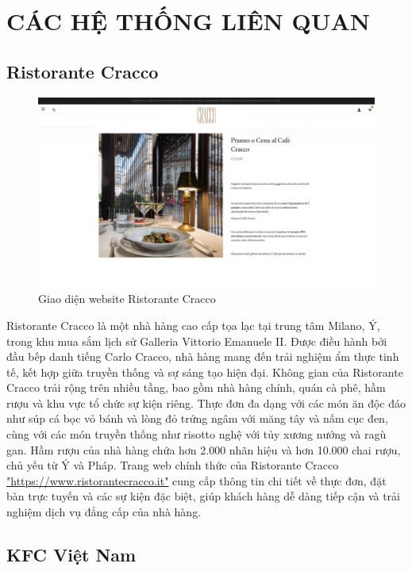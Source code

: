 \section{CÁC HỆ THỐNG LIÊN QUAN}
\subsection{Ristorante Cracco}

\begin{figure}[H]
    \centering
    \includegraphics[width=15cm]{Images/ristorante_cracco.png}
    \vspace{0.5cm}
    \caption{Giao diện website Ristorante Cracco}
    \label{fig:my_label}
\end{figure}

Ristorante Cracco là một nhà hàng cao cấp tọa lạc tại trung tâm Milano, Ý, trong khu mua sắm lịch sử Galleria Vittorio Emanuele II. Được điều hành bởi đầu bếp danh tiếng Carlo Cracco, nhà hàng mang đến trải nghiệm ẩm thực tinh tế, kết hợp giữa truyền thống và sự sáng tạo hiện đại. Không gian của Ristorante Cracco trải rộng trên nhiều tầng, bao gồm nhà hàng chính, quán cà phê, hầm rượu và khu vực tổ chức sự kiện riêng. Thực đơn đa dạng với các món ăn độc đáo như súp cá bọc vỏ bánh và lòng đỏ trứng ngâm với măng tây và nấm cục đen, cùng với các món truyền thống như risotto nghệ với tủy xương nướng và ragù gan. Hầm rượu của nhà hàng chứa hơn 2.000 nhãn hiệu và hơn 10.000 chai rượu, chủ yếu từ Ý và Pháp. Trang web chính thức của Ristorante Cracco \href{https://www.ristorantecracco.it}{"https://www.ristorantecracco.it"} cung cấp thông tin chi tiết về thực đơn, đặt bàn trực tuyến và các sự kiện đặc biệt, giúp khách hàng dễ dàng tiếp cận và trải nghiệm dịch vụ đẳng cấp của nhà hàng.

\subsection{KFC Việt Nam}

